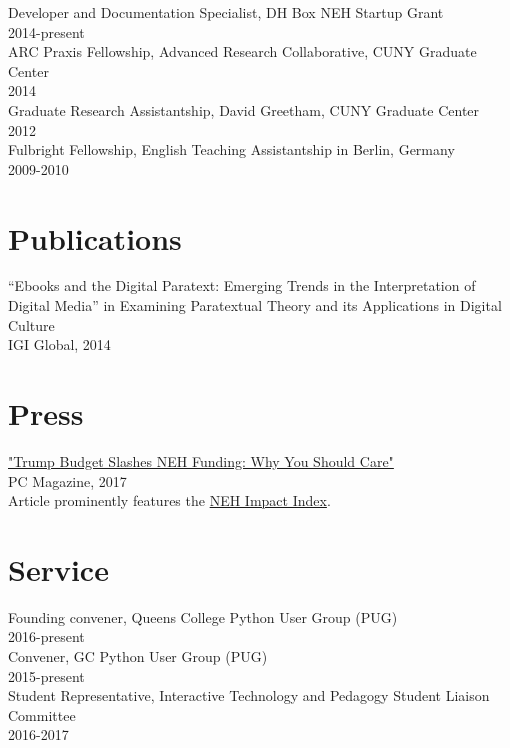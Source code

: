\documentclass[11pt]{article}
\begin{document}
Developer and Documentation Specialist, DH Box NEH Startup Grant\\
2014-present\\

ARC Praxis Fellowship, Advanced Research Collaborative, CUNY Graduate Center\\
2014\\

Graduate Research Assistantship, David Greetham, CUNY Graduate Center\\
2012\\

Fulbright Fellowship, English Teaching Assistantship in Berlin, Germany\\
2009-2010\\

\section*{Publications}
\label{sec:orgheadline3}
“Ebooks and the Digital Paratext: Emerging Trends in the Interpretation of Digital Media” in Examining Paratextual Theory and its Applications in Digital Culture\\
IGI Global, 2014\\

\section*{Press}
\label{sec:orgheadline4}
\href{http://www.pcmag.com/commentary/353904/trump-budget-slashes-neh-funding-why-you-should-care}{"Trump Budget Slashes NEH Funding: Why You Should Care"}\\
PC Magazine, 2017\\

Article prominently features the \href{http://www.nehimpact.org/}{NEH Impact Index}.\\
\section*{Service}
\label{sec:orgheadline5}
Founding convener, Queens College Python User Group (PUG)\\
2016-present\\

Convener, GC Python User Group (PUG)\\
2015-present\\

Student Representative, Interactive Technology and Pedagogy Student Liaison Committee\\
2016-2017\\
\end{document}
